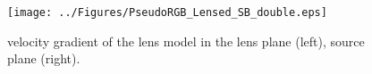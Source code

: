 \documentclass[]{emulateapj}
\begin{document}


\begin{figure}[tbph]
\centering
\texttt{[image: ../Figures/PseudoRGB\_Lensed\_SB\_double.eps]}
\caption{
velocity gradient of the lens model in the lens plane (left), source plane
(right).
\label{fig:}}
\end{figure}


\end{document}
